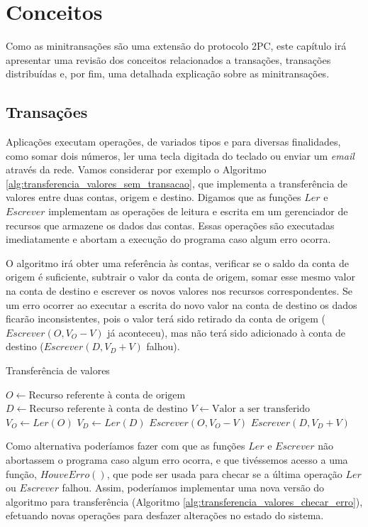 \documentclass[11pt,twoside,a4paper]{book}
\begin{document}
\chapter{Conceitos}
\label{chap:conceitos}
Como as minitransações são uma extensão do protocolo 2PC, este capítulo irá apresentar uma revisão dos conceitos relacionados a transações, transações distribuídas e, por fim, uma detalhada explicação sobre as minitransações.

\section{Transações}
\label{sec:transacoes}
Aplicações executam operações, de variados tipos e para diversas finalidades, como somar dois números, ler uma tecla digitada do teclado ou enviar um \emph{email} através da rede. Vamos considerar por exemplo o Algoritmo \ref{alg:transferencia_valores_sem_transacao}, que implementa a transferência de valores entre duas contas, origem e destino. Digamos que as funções $Ler$ e $Escrever$ implementam as operações de leitura e escrita em um gerenciador de recursos que armazene os dados das contas. Essas operações são executadas imediatamente e abortam a execução do programa caso algum erro ocorra.

O algoritmo irá obter uma referência às contas, verificar se o saldo da conta de origem é suficiente, subtrair o valor da conta de origem, somar esse mesmo valor na conta de destino e escrever os novos valores nos recursos correspondentes. Se um erro ocorrer ao executar a escrita do novo valor na conta de destino os dados ficarão inconsistentes, pois o valor terá sido retirado da conta de origem ($Escrever(O, V_O - V)$ já aconteceu), mas não terá sido adicionado à conta de destino ($Escrever(D, V_D + V)$ falhou).

\begin{algorithm}
\caption{Transferência de valores}
\label{alg:transferencia_valores_sem_transacao}
\begin{algorithmic}[1]
\State $O \gets \text{Recurso referente à conta de origem}$
\State $D \gets \text{Recurso referente à conta de destino}$
\State $V \gets \text{Valor a ser transferido}$
\State $V_O \gets Ler(O)$
    \State $V_D \gets Ler(D)$
    \State $Escrever(O, V_O - V)$
    \State $Escrever(D, V_D + V)$
\EndIf
\end{algorithmic}
\end{algorithm}

Como alternativa poderíamos fazer com que as funções $Ler$ e $Escrever$ não abortassem o programa caso algum erro ocorra, e que tivéssemos acesso a uma função, $HouveErro()$, que pode ser usada para checar se a última operação $Ler$ ou $Escrever$ falhou. Assim, poderíamos implementar uma nova versão do algoritmo para transferência (Algoritmo \ref{alg:transferencia_valores_checar_erro}), efetuando novas operações para desfazer alterações no estado do sistema.
\end{document}
